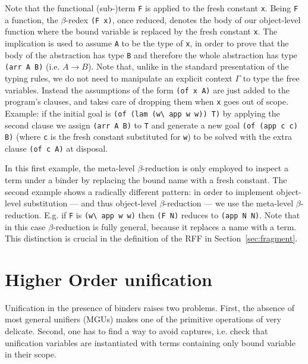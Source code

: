 \documentclass{llncs}
\begin{document}
Note that the functional (sub-)term
\verb+F+ is applied to the fresh constant \verb+x+.  Being \verb+F+ a
function, the $\beta$-redex \verb+(F x)+, once reduced, denotes the body of
our object-level function where the bound variable is replaced by the fresh
constant \verb+x+.
The implication is used to
assume \verb+A+ to be the type of \verb+x+, in order to prove that the body of
the abstraction has type \verb+B+ and therefore the whole abstraction has type
\verb+(arr A B)+ (i.e. $A \to B$). Note that, unlike in
the standard presentation of the typing rules, we do not need to manipulate an
explicit context $\Gamma$ to type the free variables. Instead the assumptions
of the form \verb+(of x A)+ are just added to the program's clauses, and \lp{}
takes care of dropping them when \verb+x+ goes out of scope.
Example: if the initial goal is
\verb+(of (lam (w\ app w w)) T)+ by applying the second clause we assign
\verb+(arr A B)+ to \verb+T+ and generate
a new goal \verb+(of (app c c) B)+ (where \verb+c+ is the fresh constant
substituted for \verb+w+) to be solved with the extra clause \verb+(of c A)+
at disposal.

In this first example, the meta-level $\beta$-reduction is only employed
to inspect a term under a binder by replacing the bound name with a fresh
constant.  The second example
shows a radically different pattern: in order to implement object-level
substitution --- and thus object-level $\beta$-reduction --- we use the
meta-level $\beta$-reduction. E.g. if \verb+F+ is \verb+(w\ app w w)+
then \verb+(F N)+ reduces to \verb+(app N N)+.  Note that in this case
$\beta$-reduction is fully general, because it replaces a name with a term.
This distinction is crucial in the definition of the RFF in
Section~\ref{sec:fragment}.

\section{Higher Order unification}%
\label{sec:ho}

Unification in the presence of binders raises two %
problems. First, the absence of most general unifiers (MGUs) makes
one of the primitive operations of \lp{} very delicate.  Second, one has
to find a way to avoid captures, i.e. check that unification variables
are instantiated with terms containing only bound variable in their scope.
\end{document}
